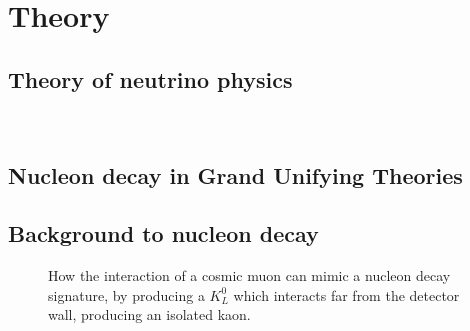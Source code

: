 
\chapter{Theory}  %

\graphicspath{{Theory/Figs/Raster/}{Theory/Figs/PDF/}{Theory/Figs/Vector/}}



\section{Theory of neutrino physics} ~\label{sec:NeutPhys}  %


\section{Nucleon decay in Grand Unifying Theories}  \label{sec:Theory_GUT} %

\section{Background to nucleon decay} \label{sec:BkNDK}  %

\begin{figure}
  \centering
  \caption[How the interaction of a cosmic muon can mimic a nucleon decay signature]
          {How the interaction of a cosmic muon can mimic a nucleon decay signature, by producing a $K^{0}_{L}$ which interacts far from the detector wall, producing an isolated kaon.}
  \label{fig:K0LongBackground}
\end{figure}


